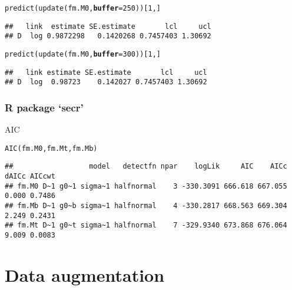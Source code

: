 \documentclass[color=usenames,dvipsnames]{beamer}\usepackage[]{graphicx}\usepackage[]{color}
\makeatletter
\newcommand{\hlnum}[1]{\textcolor[rgb]{0.69,0.494,0}{#1}}%
\newcommand{\hlstd}[1]{\textcolor[rgb]{0,0,0}{#1}}%
\newcommand{\hlkwc}[1]{\textcolor[rgb]{0,0,0}{\textbf{#1}}}%
\newcommand{\hlkwd}[1]{\textcolor[rgb]{0.004,0.004,0.506}{#1}}%
\newenvironment{kframe}{%
 \def\at@end@of@kframe{}%
 \ifinner\ifhmode%
  \def\at@end@of@kframe{\end{minipage}}%
  \begin{minipage}{\columnwidth}%
 \fi\fi%
 \def\FrameCommand##1{\hskip\@totalleftmargin \hskip-\fboxsep
 \colorbox{shadecolor}{##1}\hskip-\fboxsep
     \hskip-\linewidth \hskip-\@totalleftmargin \hskip\columnwidth}%
 \MakeFramed {\advance\hsize-\width
   \@totalleftmargin\z@ \linewidth\hsize
   \@setminipage}}%
 {\par\unskip\endMakeFramed%
 \at@end@of@kframe}
\newenvironment{knitrout}{}{} %
\makeatother
\begin{document}
\begin{frame}[fragile]
\begin{knitrout}
\begin{kframe}
\begin{alltt}
\hlkwd{predict}\hlstd{(}\hlkwd{update}\hlstd{(fm.M0,} \hlkwc{buffer}\hlstd{=}\hlnum{250}\hlstd{))[}\hlnum{1}\hlstd{,]}
\end{alltt}
\begin{verbatim}
##   link  estimate SE.estimate       lcl     ucl
## D  log 0.9872298   0.1420268 0.7457403 1.30692
\end{verbatim}
\end{kframe}
\end{knitrout}
\pause
\vspace{-12pt}
\begin{knitrout}\scriptsize
{}\color{fgcolor}\begin{kframe}
\begin{alltt}
\hlkwd{predict}\hlstd{(}\hlkwd{update}\hlstd{(fm.M0,} \hlkwc{buffer}\hlstd{=}\hlnum{300}\hlstd{))[}\hlnum{1}\hlstd{,]}
\end{alltt}
\begin{verbatim}
##   link estimate SE.estimate       lcl     ucl
## D  log  0.98723    0.142027 0.7457403 1.30692
\end{verbatim}
\end{kframe}
\end{knitrout}
\end{frame}



\begin{frame}[fragile]
  \frametitle{R package `secr'}
  AIC
\begin{knitrout}\tiny
{}\color{fgcolor}\begin{kframe}
\begin{alltt}
\hlkwd{AIC}\hlstd{(fm.M0, fm.Mt, fm.Mb)}
\end{alltt}
\begin{verbatim}
##                  model   detectfn npar    logLik     AIC    AICc dAICc AICcwt
## fm.M0 D~1 g0~1 sigma~1 halfnormal    3 -330.3091 666.618 667.055 0.000 0.7486
## fm.Mb D~1 g0~b sigma~1 halfnormal    4 -330.2817 668.563 669.304 2.249 0.2431
## fm.Mt D~1 g0~t sigma~1 halfnormal    7 -329.9340 673.868 676.064 9.009 0.0083
\end{verbatim}
\end{kframe}
\end{knitrout}
\end{frame}


\section{Data augmentation}
\end{document}
